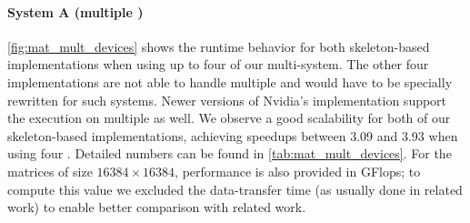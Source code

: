 \paragraph{System A (multiple \GPUs)}
\autoref{fig:mat_mult_devices} shows the runtime behavior for both \allpairs skeleton-based implementations when using up to four \GPUs of our multi-\GPU system.
The other four implementations are not able to handle multiple \GPUs and would have to be specially rewritten for such systems.
Newer versions of Nvidia's \CUBLAS implementation support the execution on multiple \GPUs as well.
We observe a good scalability for both of our skeleton-based implementations, achieving speedups between 3.09 and 3.93 when using four \GPUs.
Detailed numbers can be found in \autoref{tab:mat_mult_devices}.
For the matrices of size $16384\times 16384$, performance is also provided in GFlops;
to compute this value we excluded the data-transfer time (as usually done in related work) to enable better comparison with related work.

\FloatBarrier
